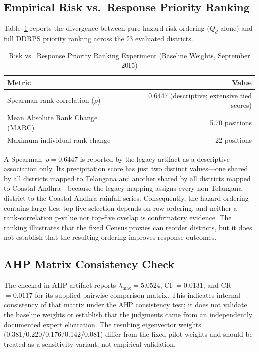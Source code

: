 \documentclass[conference]{IEEEtran}
\begin{document}
\subsection{Empirical Risk vs.\ Response Priority Ranking}
\label{sec:rankexp}

Table~\ref{tab:ranking_experiment} reports the divergence between pure
hazard-risk ordering ($Q_d$ alone) and full DDRPS priority ranking across
the 23 evaluated districts.

\begin{table}[t]
\caption{Risk vs.\ Response Priority Ranking Experiment (Baseline Weights, September 2015)}
\label{tab:ranking_experiment}
\centering
\footnotesize
\begin{tabular}{@{}lr@{}}
\toprule
Metric & Value \\
\midrule
Spearman rank correlation ($\rho$) & 0.6447 (descriptive; extensive tied scores) \\
Mean Absolute Rank Change (MARC) & 5.70 positions \\
Maximum individual rank change & 22 positions \\
\bottomrule
\end{tabular}
\end{table}

A Spearman~$\rho=0.6447$ is reported by the legacy artifact as a descriptive
association only. Its precipitation score has just two distinct values—one
shared by all districts mapped to Telangana and another shared by all districts
mapped to Coastal Andhra—because the legacy mapping assigns every non-Telangana
district to the Coastal Andhra rainfall series. Consequently, the hazard ordering
contains large ties; top-five selection depends on row ordering, and neither a
rank-correlation p-value nor top-five overlap is confirmatory evidence. The ranking illustrates that
the fixed Census proxies can reorder districts, but it does not establish that
the resulting ordering improves response outcomes.

\subsection{AHP Matrix Consistency Check}
The checked-in AHP artifact reports $\lambda_{\max}=5.0524$, CI $=0.0131$,
and CR $=0.0117$ for its supplied pairwise-comparison matrix. This indicates
internal consistency of that matrix under the AHP consistency test; it does
not validate the baseline weights or establish that the judgments came from
an independently documented expert elicitation. The resulting eigenvector
weights (0.381/0.220/0.176/0.142/0.081) differ from the fixed pilot weights and
should be treated as a sensitivity variant, not empirical validation.
\end{document}
